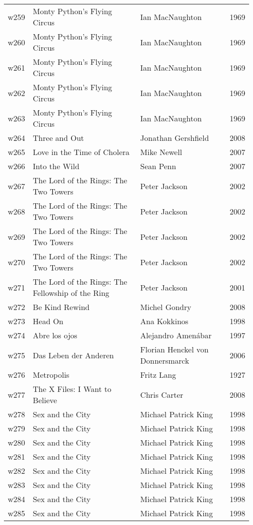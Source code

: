 \documentclass{article}
\begin{document}
\begin {center}
\begin{longtable}{l p{10cm} l l}
w259 & Monty Python's Flying Circus & Ian MacNaughton & 1969 \\
w260 & Monty Python's Flying Circus & Ian MacNaughton & 1969 \\
w261 & Monty Python's Flying Circus & Ian MacNaughton & 1969 \\
w262 & Monty Python's Flying Circus & Ian MacNaughton & 1969 \\
w263 & Monty Python's Flying Circus & Ian MacNaughton & 1969 \\
w264 & Three and Out & Jonathan Gershfield & 2008 \\
w265 & Love in the Time of Cholera & Mike Newell & 2007 \\
w266 & Into the Wild & Sean Penn & 2007 \\
w267 & The Lord of the Rings: The Two Towers & Peter Jackson & 2002 \\
w268 & The Lord of the Rings: The Two Towers & Peter Jackson & 2002 \\
w269 & The Lord of the Rings: The Two Towers & Peter Jackson & 2002 \\
w270 & The Lord of the Rings: The Two Towers & Peter Jackson & 2002 \\
w271 & The Lord of the Rings: The Fellowship of the Ring & Peter Jackson & 2001 \\
w272 & Be Kind Rewind & Michel Gondry & 2008 \\
w273 & Head On & Ana Kokkinos & 1998 \\
w274 & Abre los ojos & Alejandro Amenábar & 1997 \\
w275 & Das Leben der Anderen & Florian Henckel von Donnersmarck & 2006 \\
w276 & Metropolis & Fritz Lang & 1927 \\
w277 & The X Files: I Want to Believe & Chris Carter & 2008 \\
w278 & Sex and the City & Michael Patrick King & 1998 \\
w279 & Sex and the City & Michael Patrick King & 1998 \\
w280 & Sex and the City & Michael Patrick King & 1998 \\
w281 & Sex and the City & Michael Patrick King & 1998 \\
w282 & Sex and the City & Michael Patrick King & 1998 \\
w283 & Sex and the City & Michael Patrick King & 1998 \\
w284 & Sex and the City & Michael Patrick King & 1998 \\
w285 & Sex and the City & Michael Patrick King & 1998 \\

\end{longtable}
\end{center}
\end{document}
